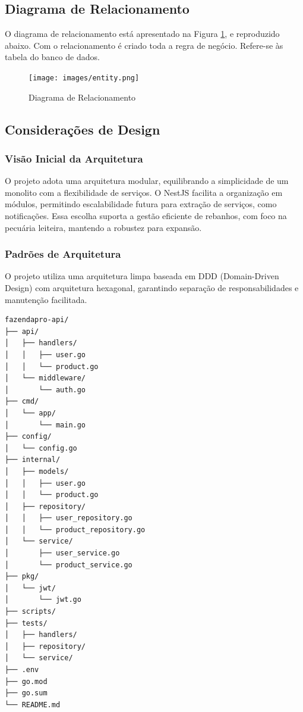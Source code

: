 \documentclass[12pt, a4paper]{article}
\begin{document}
\subsection{Diagrama de Relacionamento}
\begin{spacing}{1.5}
O diagrama de relacionamento está apresentado na Figura \ref{fig:entity-relationship}, e reproduzido abaixo. Com o relacionamento é criado toda a regra de negócio. Refere-se às tabela do banco de dados.
\begin{figure}[H]
    \centering
    \texttt{[image: images/entity.png]}
    \caption{Diagrama de Relacionamento}
    \label{fig:entity-relationship}
\end{figure}
\end{spacing}

\subsection{Considerações de Design}
\subsubsection{Visão Inicial da Arquitetura}
\begin{spacing}{1.5}
O projeto adota uma arquitetura modular, equilibrando a simplicidade de um monolito com a flexibilidade de serviços. O NestJS facilita a organização em módulos, permitindo escalabilidade futura para extração de serviços, como notificações. Essa escolha suporta a gestão eficiente de rebanhos, com foco na pecuária leiteira, mantendo a robustez para expansão.
\end{spacing}

\subsubsection{Padrões de Arquitetura}
\begin{spacing}{1.5}
O projeto utiliza uma arquitetura limpa baseada em DDD (Domain-Driven Design) com arquitetura hexagonal, garantindo separação de responsabilidades e manutenção facilitada.
\end{spacing}

\begin{lstlisting}[language=bash, caption={Estrutura de Diretórios do Projeto}]
fazendapro-api/
├── api/
│   ├── handlers/
│   │   ├── user.go
│   │   └── product.go
│   └── middleware/
│       └── auth.go
├── cmd/
│   └── app/
│       └── main.go
├── config/
│   └── config.go
├── internal/
│   ├── models/
│   │   ├── user.go
│   │   └── product.go
│   ├── repository/
│   │   ├── user_repository.go
│   │   └── product_repository.go
│   └── service/
│       ├── user_service.go
│       └── product_service.go
├── pkg/
│   └── jwt/
│       └── jwt.go
├── scripts/
├── tests/
│   ├── handlers/
│   ├── repository/
│   └── service/
├── .env
├── go.mod
├── go.sum
└── README.md
\end{lstlisting}
\end{document}
